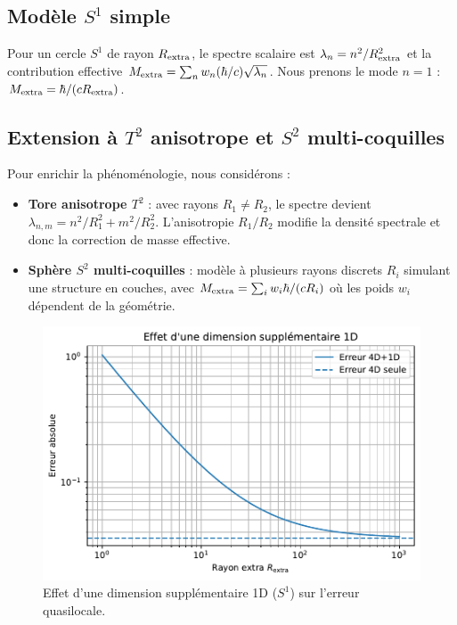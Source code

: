 \documentclass[11pt]{article}
\begin{document}
\subsection{Mod\`ele $S^1$ simple}
Pour un cercle $S^1$ de rayon $R_{\rm extra}$, le spectre scalaire est $\lambda_n=n^2/R_{\rm extra}^2$ et la contribution effective
$M_{\rm extra}=\sum_n w_n (\hbar/c)\sqrt{\lambda_n}$. Nous prenons le mode $n=1$ : $M_{\rm extra}=\hbar/(c R_{\rm extra})$.

\subsection{Extension \`a $T^2$ anisotrope et $S^2$ multi-coquilles}
Pour enrichir la ph\'enom\'enologie, nous consid\'erons : 
\begin{itemize}
\item \textbf{Tore anisotrope $T^2$} : avec rayons $R_1 \neq R_2$, le spectre devient $\lambda_{n,m} = n^2/R_1^2 + m^2/R_2^2$. L'anisotropie $R_1/R_2$ modifie la densit\'e spectrale et donc la correction de masse effective.
\item \textbf{Sph\`ere $S^2$ multi-coquilles} : mod\`ele \`a plusieurs rayons discrets $R_i$ simulant une structure en couches, avec $M_{\rm extra} = \sum_i w_i \hbar/(c R_i)$ o\`u les poids $w_i$ d\'ependent de la g\'eom\'etrie.
\end{itemize}

\begin{figure}[!htb]
\centering
\includegraphics[width=.75\linewidth]{fig_extra_dimension_effect_improved.pdf}
\caption{Effet d'une dimension suppl\'ementaire 1D (\(S^1\)) sur l'erreur quasilocale.}
\end{figure}
\end{document}
